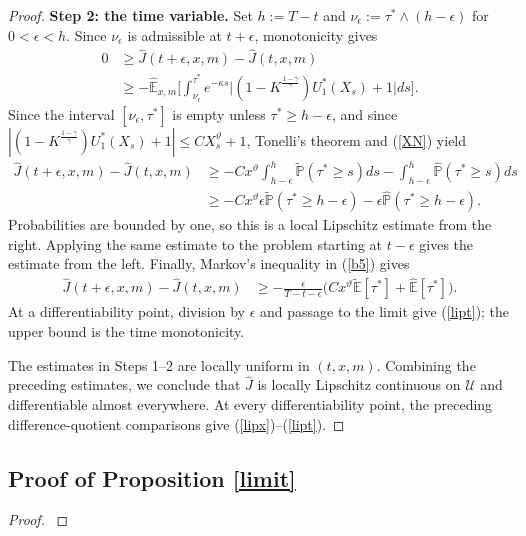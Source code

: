 \documentclass[a4paper,11pt]{amsart}
\numberwithin{equation}{section}
\begin{document}
{\begin{proof}
\textbf{Step 2: the time variable.}  Set $h:=T-t$ and $\nu_\epsilon:=\tau^\ast\wedge(h-\epsilon)$ for $0<\epsilon<h$. Since $\nu_\epsilon$ is admissible at $t+\epsilon$, monotonicity gives
\begin{align*}
0&\geq\widehat J(t+\epsilon,x,m)-\widehat J(t,x,m)\nonumber\\
&\geq-\widehat{\mathbb E}_{x,m}\bigg[\int_{\nu_\epsilon}^{\tau^\ast}e^{-\kappa s}\bigg|(1-K^{\frac{1-\gamma}{\gamma}})U_1^\ast(X_s)+1\bigg|ds\bigg].
\end{align*}
Since the interval $[\nu_\epsilon,\tau^\ast]$ is empty unless $\tau^\ast\geq h-\epsilon$, and since $|(1-K^{\frac{1-\gamma}{\gamma}})U_1^\ast(X_s)+1|\leq CX_s^\vartheta+1$, Tonelli's theorem and (\ref{XN}) yield
\begin{align}\label{b5}
\widehat J(t+\epsilon,x,m)-\widehat J(t,x,m)&\geq-Cx^\vartheta\int_{h-\epsilon}^h\widetilde{\mathbb P}(\tau^\ast\geq s)ds-\int_{h-\epsilon}^h\widehat{\mathbb P}(\tau^\ast\geq s)ds\nonumber\\
&\geq-Cx^\vartheta\epsilon\widetilde{\mathbb P}(\tau^\ast\geq h-\epsilon)-\epsilon\widehat{\mathbb P}(\tau^\ast\geq h-\epsilon).
\end{align}
Probabilities are bounded by one, so this is a local Lipschitz estimate from the right. Applying the same estimate to the problem starting at $t-\epsilon$ gives the estimate from the left. Finally, Markov's inequality in (\ref{b5}) gives
\begin{align*}
\widehat J(t+\epsilon,x,m)-\widehat J(t,x,m)&\geq-\frac{\epsilon}{T-t-\epsilon}\bigg(Cx^\vartheta\widetilde{\mathbb E}[\tau^\ast]+\widehat{\mathbb E}[\tau^\ast]\bigg).
\end{align*}
At a differentiability point, division by $\epsilon$ and passage to the limit give (\ref{lipt}); the upper bound is the time monotonicity.

The estimates in Steps 1--2 are locally uniform in $(t,x,m)$. Combining the preceding estimates, we conclude that $\widehat J$ is locally Lipschitz continuous on $\mathcal U$ and differentiable almost everywhere. At every differentiability point, the preceding difference-quotient comparisons give (\ref{lipx})--(\ref{lipt}).
\end{proof}


\subsection{Proof of Proposition \ref{limit}}
\begin{proof}\label{prolimit}


\end{proof}}
\end{document}
